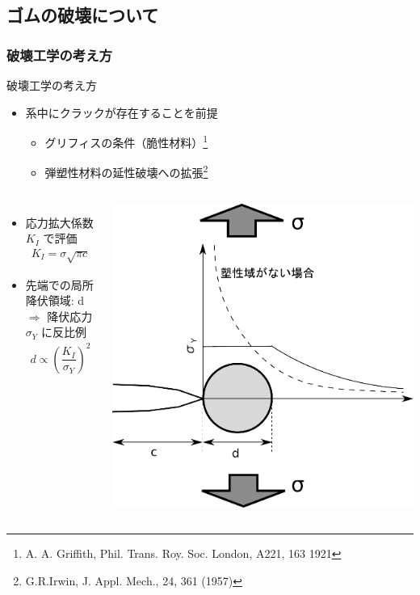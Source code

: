 \documentclass[12pt, dvipdfmx]{beamer}
\begin{document}
\subsection{ゴムの破壊について}
\begin{frame}
    \frametitle{破壊工学の考え方}
    \begin{exampleblock}{破壊工学の考え方}
		\begin{itemize}
			\item 系中に\alert{クラックが存在することを前提}
			\begin{itemize}
				\item グリフィスの条件（脆性材料）\footnote[1]{
					A. A. Griffith, Phil. Trans. Roy. Soc. London, A221, 163 {1921}
					}
					\item 弾塑性材料の延性破壊への拡張\footnote[2]{
						G.R.Irwin, J. Appl. Mech., 24, 361 (1957)
						}
			\end{itemize}
		\end{itemize}
	\end{exampleblock}

	\begin{columns}[totalwidth=1\textwidth]
			\begin{itemize}
				\item
				\alert{応力拡大係数 $K_I$} で評価
				\footnotesize
				\begin{align*}
				K_{I} = \sigma \sqrt{\pi c}
				\end{align*}
				\normalsize
				\item 
				先端での\alert{局所降伏領域: d}\\
				$\Rightarrow$ 降伏応力 $\sigma_Y$ に反比例
				\footnotesize
				\begin{align*}
				d \propto \left( \dfrac{K_I}{\sigma_Y} \right)^2
				\end{align*}
				\normalsize
			\end{itemize}
			\centering
			\includegraphics[width=.85\textwidth]{./Crack_Yield.pdf}
		\end{columns}
\end{frame}
\end{document}
